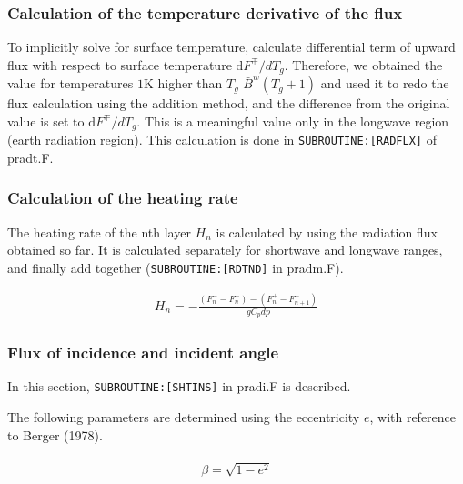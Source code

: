 \hypertarget{calculation-of-the-temperature-derivative-of-the-flux}{%
\subsubsection{Calculation of the temperature derivative of the
flux}\label{calculation-of-the-temperature-derivative-of-the-flux}}

To implicitly solve for surface temperature, calculate differential term
of upward flux with respect to surface temperature
\(\mathrm{d}F^{\mp}/dT_{g}\). Therefore, we obtained the value for
temperatures \(1\text{K}\) higher than \(T_g\)
\(\bar{B}^{w}\left(T_{g}+1\right)\) and used it to redo the flux
calculation using the addition method, and the difference from the
original value is set to \(\mathrm{d}F^{\mp}/dT_{g}\). This is a
meaningful value only in the longwave region (earth radiation region).
This calculation is done in \texttt{SUBROUTINE:{[}RADFLX{]}} of pradt.F.

\hypertarget{calculation-of-the-heating-rate}{%
\subsubsection{Calculation of the heating
rate}\label{calculation-of-the-heating-rate}}

The heating rate of the nth layer \(H_n\) is calculated by using the
radiation flux obtained so far. It is calculated separately for
shortwave and longwave ranges, and finally add together
(\texttt{SUBROUTINE:{[}RDTND{]}} in pradm.F).

\begin{eqnarray}
H_{n}=-\frac{\left(F_{n}^{-}-F_{n}^{-}\right)-\left(F_{n}^{+}-F_{n+1}^{+}\right)}{g C_{p} d p}
\end{eqnarray}

\hypertarget{flux-of-incidence-and-incident-angle}{%
\subsubsection{Flux of incidence and incident
angle}\label{flux-of-incidence-and-incident-angle}}

In this section, \texttt{SUBROUTINE:{[}SHTINS{]}} in pradi.F is
described.

The following parameters are determined using the eccentricity \(e\),
with reference to Berger (1978).

\begin{eqnarray}
\begin{array}{l}
\beta=\sqrt{1-e^{2}}
\end{array}
\end{eqnarray}

